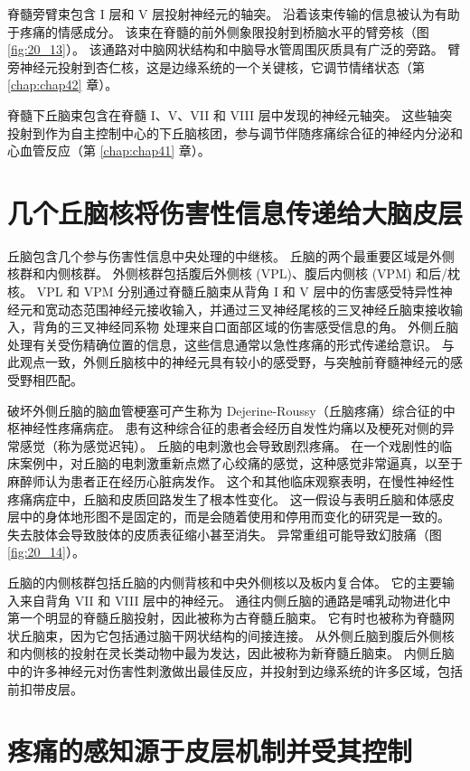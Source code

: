 脊髓旁臂束包含 I 层和 V 层投射神经元的轴突。
沿着该束传输的信息被认为有助于疼痛的情感成分。 
该束在脊髓的前外侧象限投射到桥脑水平的臂旁核（图 \ref{fig:20_13}）。 
该通路对中脑网状结构和中脑导水管周围灰质具有广泛的旁路。 
臂旁神经元投射到杏仁核，这是边缘系统的一个关键核，它调节情绪状态（第 \ref{chap:chap42} 章）。


脊髓下丘脑束包含在脊髓 I、V、VII 和 VIII 层中发现的神经元轴突。 
这些轴突投射到作为自主控制中心的下丘脑核团，参与调节伴随疼痛综合征的神经内分泌和心血管反应（第 \ref{chap:chap41} 章）。


\section{几个丘脑核将伤害性信息传递给大脑皮层}
丘脑包含几个参与伤害性信息中央处理的中继核。 
丘脑的两个最重要区域是外侧核群和内侧核群。 
外侧核群包括腹后外侧核 (VPL)、腹后内侧核 (VPM) 和后/枕核。 
VPL 和 VPM 分别通过脊髓丘脑束从背角 I 和 V 层中的伤害感受特异性神经元和宽动态范围神经元接收输入，并通过三叉神经尾核的三叉神经丘脑束接收输入，背角的三叉神经同系物 处理来自口面部区域的伤害感受信息的角。 
外侧丘脑处理有关受伤精确位置的信息，这些信息通常以急性疼痛的形式传递给意识。 
与此观点一致，外侧丘脑核中的神经元具有较小的感受野，与突触前脊髓神经元的感受野相匹配。


破坏外侧丘脑的脑血管梗塞可产生称为 Dejerine-Roussy（丘脑疼痛）综合征的中枢神经性疼痛病症。 
患有这种综合征的患者会经历自发性灼痛以及梗死对侧的异常感觉（称为感觉迟钝）。 
丘脑的电刺激也会导致剧烈疼痛。 
在一个戏剧性的临床案例中，对丘脑的电刺激重新点燃了心绞痛的感觉，这种感觉非常逼真，以至于麻醉师认为患者正在经历心脏病发作。 
这个和其他临床观察表明，在慢性神经性疼痛病症中，丘脑和皮质回路发生了根本性变化。 
这一假设与表明丘脑和体感皮层中的身体地形图不是固定的，而是会随着使用和停用而变化的研究是一致的。 
失去肢体会导致肢体的皮质表征缩小甚至消失。 
异常重组可能导致幻肢痛（图 \ref{fig:20_14}）。


丘脑的内侧核群包括丘脑的内侧背核和中央外侧核以及板内复合体。 
它的主要输入来自背角 VII 和 VIII 层中的神经元。 
通往内侧丘脑的通路是哺乳动物进化中第一个明显的脊髓丘脑投射，因此被称为古脊髓丘脑束。 
它有时也被称为脊髓网状丘脑束，因为它包括通过脑干网状结构的间接连接。 
从外侧丘脑到腹后外侧核和内侧核的投射在灵长类动物中最为发达，因此被称为新脊髓丘脑束。 
内侧丘脑中的许多神经元对伤害性刺激做出最佳反应，并投射到边缘系统的许多区域，包括前扣带皮层。


\section{疼痛的感知源于皮层机制并受其控制}

